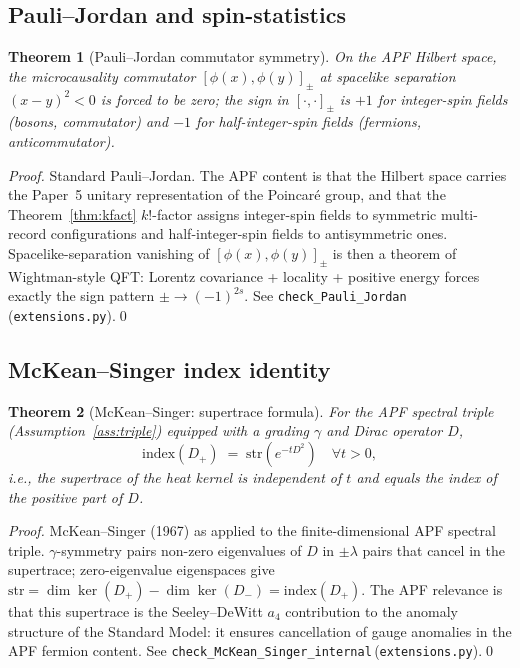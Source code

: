 \documentclass[11pt,a4paper]{article}
\newtheorem{theorem}{Theorem}[section]
\theoremstyle{definition}
\newcommand{\coderef}[2]{\texttt{#1}\,(\texttt{#2})}
\begin{document}
\subsection{Pauli--Jordan and spin-statistics}

\begin{theorem}[Pauli--Jordan commutator symmetry]
\label{thm:PJ}
On the APF Hilbert space, the microcausality commutator $[\phi(x),\phi(y)]_\pm$ at spacelike separation $(x-y)^2<0$ is forced to be zero; the sign in $[\cdot,\cdot]_\pm$ is $+1$ for integer-spin fields (bosons, commutator) and $-1$ for half-integer-spin fields (fermions, anticommutator).
\end{theorem}

\begin{proof}
Standard Pauli--Jordan.  The APF content is that the Hilbert space carries the Paper~5 unitary representation of the Poincaré group, and that the Theorem~\ref{thm:kfact} $k!$-factor assigns integer-spin fields to symmetric multi-record configurations and half-integer-spin fields to antisymmetric ones.  Spacelike-separation vanishing of $[\phi(x),\phi(y)]_\pm$ is then a theorem of Wightman-style QFT: Lorentz covariance + locality + positive energy forces exactly the sign pattern $\pm\to (-1)^{2s}$.  See \coderef{check\_Pauli\_Jordan}{extensions.py}.\qed
\end{proof}

\subsection{McKean--Singer index identity}

\begin{theorem}[McKean--Singer: supertrace formula]
\label{thm:McKS}
For the APF spectral triple (Assumption~\ref{ass:triple}) equipped with a grading $\gamma$ and Dirac operator $D$,
\[
   \mathrm{index}(D_+) \;=\; \mathrm{str}(e^{-tD^2}) \quad \forall t>0,
\]
i.e., the supertrace of the heat kernel is independent of $t$ and equals the index of the positive part of $D$.
\end{theorem}

\begin{proof}
McKean--Singer (1967) as applied to the finite-dimensional APF spectral triple.  $\gamma$-symmetry pairs non-zero eigenvalues of $D$ in $\pm\lambda$ pairs that cancel in the supertrace; zero-eigenvalue eigenspaces give $\mathrm{str}=\dim\ker(D_+)-\dim\ker(D_-)=\mathrm{index}(D_+)$.  The APF relevance is that this supertrace is the Seeley--DeWitt $a_4$ contribution to the anomaly structure of the Standard Model: it ensures cancellation of gauge anomalies in the APF fermion content.  See \coderef{check\_McKean\_Singer\_internal}{extensions.py}.\qed
\end{proof}
\end{document}
